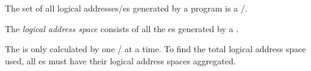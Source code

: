 The set of all logical addresses/es generated by a program is a /.

\begin{definition}\label{def:Logical_Address_Space}
  The \emph{logical address space} consists of all the es generated by a .

  \begin{remark}
    The  is only calculated by one / at a time.
    To find the total logical address space used, all es must have their logical address spaces aggregated.
  \end{remark}
\end{definition}


